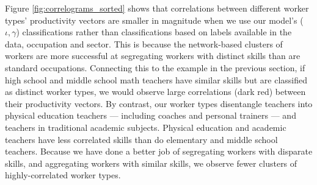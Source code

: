 \documentclass[12pt]{article}
\def\g{\gamma}
\def\i{\iota}
\theoremstyle{definition}
\theoremstyle{plain}
\begin{document}
Figure \ref{fig:correlograms_sorted} shows that correlations between different worker types' productivity vectors are smaller in magnitude when we use our model's ($\i,\g$) classifications rather than classifications based on labels available in the data, occupation and sector.  This is because the network-based clusters of workers are more successful at segregating workers with distinct skills than are standard occupations. Connecting this to the example in the previous section, if high school and middle school math teachers have similar skills but are classified as distinct worker types, we would observe large correlations (dark red) between their productivity vectors. By contrast, our worker types disentangle teachers into physical education teachers --- including coaches and personal trainers --- and teachers in traditional academic subjects. Physical education and academic teachers have less correlated skills than do elementary and middle school teachers.  Because we have done a better job of segregating workers with disparate skills, and aggregating workers with similar skills, we observe fewer clusters of highly-correlated worker types. 




%
\end{document}
